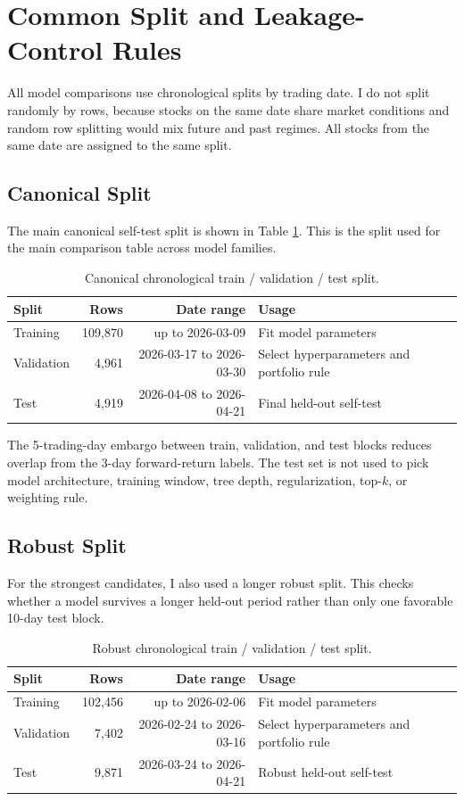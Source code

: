 \documentclass[11pt]{article}
\begin{document}
\section{Common Split and Leakage-Control Rules}

All model comparisons use chronological splits by trading date. I do not split
randomly by rows, because stocks on the same date share market conditions and
random row splitting would mix future and past regimes. All stocks from the
same date are assigned to the same split.

\subsection{Canonical Split}

The main canonical self-test split is shown in Table
\ref{tab:canonical-split}. This is the split used for the main comparison table
across model families.

\begin{table}[h]
\centering
\caption{Canonical chronological train / validation / test split.}
\label{tab:canonical-split}
\begin{tabular}{lrrl}
\toprule
Split & Rows & Date range & Usage \\
\midrule
Training & 109,870 & up to 2026-03-09 & Fit model parameters \\
Validation & 4,961 & 2026-03-17 to 2026-03-30 & Select hyperparameters and portfolio rule \\
Test & 4,919 & 2026-04-08 to 2026-04-21 & Final held-out self-test \\
\bottomrule
\end{tabular}
\end{table}

The 5-trading-day embargo between train, validation, and test blocks reduces
overlap from the 3-day forward-return labels. The test set is not used to pick
model architecture, training window, tree depth, regularization, top-\(k\), or
weighting rule.

\subsection{Robust Split}

For the strongest candidates, I also used a longer robust split. This checks
whether a model survives a longer held-out period rather than only one favorable
10-day test block.

\begin{table}[h]
\centering
\caption{Robust chronological train / validation / test split.}
\label{tab:robust-split}
\begin{tabular}{lrrl}
\toprule
Split & Rows & Date range & Usage \\
\midrule
Training & 102,456 & up to 2026-02-06 & Fit model parameters \\
Validation & 7,402 & 2026-02-24 to 2026-03-16 & Select hyperparameters and portfolio rule \\
Test & 9,871 & 2026-03-24 to 2026-04-21 & Robust held-out self-test \\
\bottomrule
\end{tabular}
\end{table}
\end{document}

